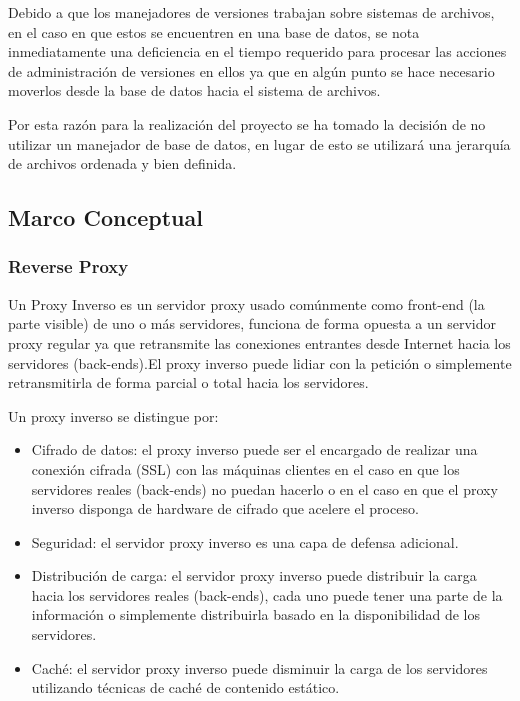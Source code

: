 Debido a que los manejadores de versiones trabajan sobre sistemas de archivos, en el caso en que estos se encuentren en una base de datos, se nota inmediatamente una deficiencia en el tiempo requerido para procesar las acciones de administración de versiones en ellos ya que en algún punto se hace necesario moverlos desde la base de datos hacia el sistema de archivos.

Por esta razón para la realización del proyecto se ha tomado la decisión de no utilizar un manejador de base de datos, en lugar de esto se utilizará una jerarquía de archivos ordenada y bien definida.



\subsection{Marco Conceptual}

\subsubsection*{Reverse Proxy}

Un Proxy Inverso es un servidor proxy usado comúnmente como front-end (la parte visible) de uno o más servidores, funciona de forma opuesta a un servidor proxy regular ya que retransmite las conexiones entrantes desde Internet hacia los servidores (back-ends).\newline El proxy inverso puede lidiar con la petición o simplemente retransmitirla de forma parcial o total hacia los servidores.

Un proxy inverso se distingue por:

\begin{itemize}

	\item Cifrado de datos: el proxy inverso puede ser el encargado de realizar una conexión cifrada (SSL) con las máquinas clientes en el caso en que los servidores reales (back-ends) no puedan hacerlo o en el caso en que el proxy inverso disponga de hardware de cifrado que acelere el proceso.
	
	\item Seguridad: el servidor proxy inverso es una capa de defensa adicional.
	
	\item Distribución de carga: el servidor proxy inverso puede distribuir la carga hacia los servidores reales (back-ends), cada uno puede tener una parte de la información o simplemente distribuirla basado en la disponibilidad de los servidores.
	
	\item Caché: el servidor proxy inverso puede disminuir la carga de los servidores utilizando técnicas de caché de contenido estático.

\end{itemize}


